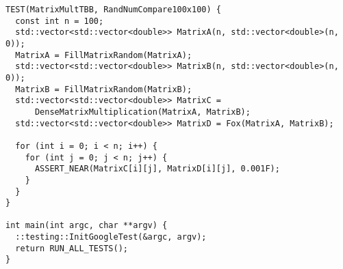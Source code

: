 \documentclass{report}
\begin{document}
\begin{lstlisting}
TEST(MatrixMultTBB, RandNumCompare100x100) {
  const int n = 100;
  std::vector<std::vector<double>> MatrixA(n, std::vector<double>(n, 0));
  MatrixA = FillMatrixRandom(MatrixA);
  std::vector<std::vector<double>> MatrixB(n, std::vector<double>(n, 0));
  MatrixB = FillMatrixRandom(MatrixB);
  std::vector<std::vector<double>> MatrixC =
      DenseMatrixMultiplication(MatrixA, MatrixB);
  std::vector<std::vector<double>> MatrixD = Fox(MatrixA, MatrixB);

  for (int i = 0; i < n; i++) {
    for (int j = 0; j < n; j++) {
      ASSERT_NEAR(MatrixC[i][j], MatrixD[i][j], 0.001F);
    }
  }
}

int main(int argc, char **argv) {
  ::testing::InitGoogleTest(&argc, argv);
  return RUN_ALL_TESTS();
}
 \end{lstlisting}
 
\end{document}
